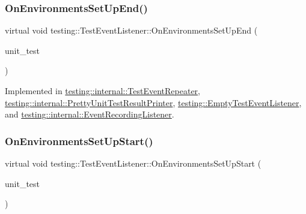 \subsubsection{\texorpdfstring{On\+Environments\+Set\+Up\+End()}{OnEnvironmentsSetUpEnd()}}
{\footnotesize\ttfamily virtual void testing\+::\+Test\+Event\+Listener\+::\+On\+Environments\+Set\+Up\+End (\begin{DoxyParamCaption}\item[{const \hyperlink{classtesting_1_1_unit_test}{Unit\+Test} \&}]{unit\+\_\+test }\end{DoxyParamCaption})\hspace{0.3cm}{\ttfamily [pure virtual]}}



Implemented in \hyperlink{classtesting_1_1internal_1_1_test_event_repeater_a3a92696df942dc92f985e52fddd6d303}{testing\+::internal\+::\+Test\+Event\+Repeater}, \hyperlink{classtesting_1_1internal_1_1_pretty_unit_test_result_printer_aadba892f02606a8b0c5f5982b3553aac}{testing\+::internal\+::\+Pretty\+Unit\+Test\+Result\+Printer}, \hyperlink{classtesting_1_1_empty_test_event_listener_abc481c6648d15d4242245195a06f5aa0}{testing\+::\+Empty\+Test\+Event\+Listener}, and \hyperlink{classtesting_1_1internal_1_1_event_recording_listener_a40b4c5e05abd1aa11a030f999f6adb8f}{testing\+::internal\+::\+Event\+Recording\+Listener}.

\mbox{\label{classtesting_1_1_test_event_listener_aa6502e534919605be45f26a6daf9a40c}} 
\subsubsection{\texorpdfstring{On\+Environments\+Set\+Up\+Start()}{OnEnvironmentsSetUpStart()}}
{\footnotesize\ttfamily virtual void testing\+::\+Test\+Event\+Listener\+::\+On\+Environments\+Set\+Up\+Start (\begin{DoxyParamCaption}\item[{const \hyperlink{classtesting_1_1_unit_test}{Unit\+Test} \&}]{unit\+\_\+test }\end{DoxyParamCaption})\hspace{0.3cm}{\ttfamily [pure virtual]}}



